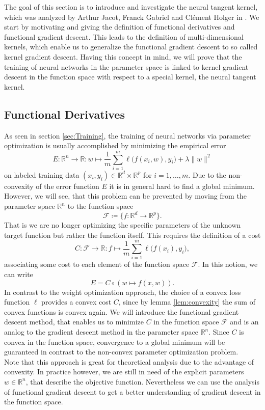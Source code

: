 \documentclass[11pt, a4paper]{article}
\newcommand{\R}{\mathds{R}}
\newcommand{\F}{\mathcal{F}}
\begin{document}
The goal of this section is to introduce and investigate the neural tangent kernel, which was analyzed by Arthur Jacot, Franck Gabriel and Cl\'{e}ment Holger in \cite{NTK}. We start by motivating and giving the definition of functional derivatives and functional gradient descent. This leads to the definition of multi-dimensional kernels, which enable us to generalize the functional gradient descent to so called kernel gradient descent. Having this concept in mind, we will prove that the training of neural networks in the parameter space is linked to kernel gradient descent in the function space with respect to a special kernel, the neural tangent kernel.
\subsection{Functional Derivatives}

As seen in section \ref{sec:Training}, the training of neural networks via parameter optimization is usually accomplished by minimizing the empirical error
\[ E : \R^n \to \R : w \mapsto \frac{1}{m} \sum_{i=1}^{m} \ell \big ( f(x_i,w),y_i \big) + \lambda \| w \|^2 \]
on labeled training data $(x_i,y_i) \in \R^d \times \R^p$ for $i=1, \dots, m$. Due to the non-convexity of the error function $E$ it is in general hard to find a global minimum. However, we will see, that this problem can be prevented by moving from the parameter space $\R^n$ to the function space
\[ \F \coloneq \Big \{ f: \R^d \to \R^p \Big \}. \]
That is we are no longer optimizing the specific parameters of the unknown target function but rather the function itself. This requires the definition of a cost
\[ C: \F \to \R : f \mapsto \frac{1}{m} \sum_{i=1}^{m} \ell \big ( f(x_i),y_i \big), \]
associating some cost to each element of the function space $\F$.  In this notion, we can write
\[ E = C \circ (w \mapsto f(x,w)). \]
In contrast to the weight optimization approach, the choice of a convex loss function $\ell$ provides a convex cost $C$, since by lemma \ref{lem:convexity} the sum of convex functions is convex again. We will introduce the functional gradient descent method, that enables us to minimize $C$ in the function space $\F$ and is an analog to the gradient descent method in the parameter space $\R^n$. Since $C$ is convex in the function space, convergence to a global minimum will be guaranteed in contrast to the non-convex parameter optimization problem. \\

Note that this approach is great for theoretical analysis due to the advantage of convexity. In practice however, we are still in need of the explicit parameters $w \in \R^n$, that describe the objective function. Nevertheless we can use the analysis of functional gradient descent to get a better understanding of gradient descent in the function space. \\
\end{document}
